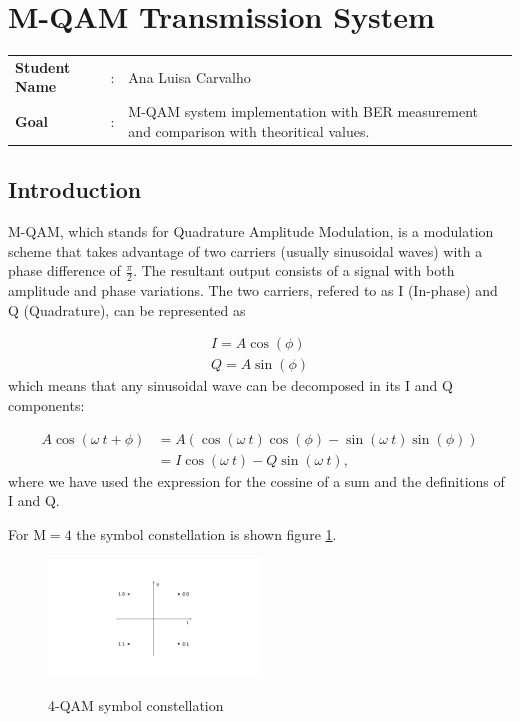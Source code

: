 \clearpage
\section{M-QAM Transmission System}

\begin{tcolorbox}	
	\begin{tabular}{p{2.75cm} p{0.2cm} p{10.5cm}} 	
		\textbf{Student Name}  &:& Ana Luisa Carvalho\\
		\textbf{Goal}          &:& M-QAM system implementation with BER measurement and comparison with theoritical values.
	\end{tabular}
\end{tcolorbox}

\subsection{Introduction}

M-QAM, which stands for Quadrature Amplitude Modulation, is a modulation scheme that takes advantage of two carriers (usually sinusoidal waves) with a phase difference of $\frac{\pi}{2}$. The resultant output consists of a signal with both amplitude and phase variations. The two carriers, refered to as I (In-phase) and Q (Quadrature), can be represented as 

\begin{align}
	I=A\cos(\phi) \\
	Q=A\sin(\phi)
\end{align}
which means that any sinusoidal wave can be decomposed in its I and Q components:

\begin{align}
A\cos(\omega~t+\phi)&=A\left(\cos(\omega~t)\cos(\phi)-\sin(\omega~t)\sin(\phi)\right) \\
&=I\cos(\omega~t)-Q\sin(\omega~t),
\end{align} 
where we have used the expression for the cossine of a sum and the definitions of I and Q.

For M$=4$ the symbol constellation is shown figure \ref{fig:MQAM_constellation}.

\begin{figure}
	\centering
	\includegraphics[width=0.5\textwidth]{./figures/MQAM_constellation}
	\label{fig:MQAM_constellation}
	\caption{4-QAM symbol constellation}
\end{figure}

